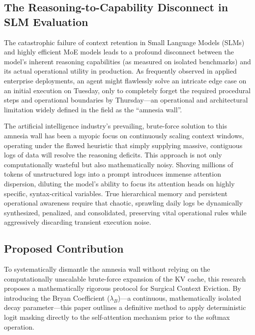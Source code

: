 \documentclass[11pt,a4paper]{article}
\newcommand{\bryanCoeff}{\lambda_B}
\begin{document}
\subsection{The Reasoning-to-Capability Disconnect in SLM Evaluation}
The catastrophic failure of context retention in Small Language Models (SLMs) and highly efficient MoE models leads to a profound disconnect between the model's inherent reasoning capabilities (as measured on isolated benchmarks) and its actual operational utility in production. As frequently observed in applied enterprise deployments, an agent might flawlessly solve an intricate edge case on an initial execution on Tuesday, only to completely forget the required procedural steps and operational boundaries by Thursday---an operational and architectural limitation widely defined in the field as the ``amnesia wall''.\cite{1}

The artificial intelligence industry's prevailing, brute-force solution to this amnesia wall has been a myopic focus on continuously scaling context windows, operating under the flawed heuristic that simply supplying massive, contiguous logs of data will resolve the reasoning deficits.\cite{1} This approach is not only computationally wasteful but also mathematically noisy. Shoving millions of tokens of unstructured logs into a prompt introduces immense attention dispersion, diluting the model's ability to focus its attention heads on highly specific, syntax-critical variables.\cite{1} True hierarchical memory and persistent operational awareness require that chaotic, sprawling daily logs be dynamically synthesized, penalized, and consolidated, preserving vital operational rules while aggressively discarding transient execution noise.\cite{1}

\subsection{Proposed Contribution}
To systematically dismantle the amnesia wall without relying on the computationally unscalable brute-force expansion of the KV cache, this research proposes a mathematically rigorous protocol for Surgical Context Eviction. By introducing the Bryan Coefficient (\(\bryanCoeff\))---a continuous, mathematically isolated decay parameter---this paper outlines a definitive method to apply deterministic logit masking directly to the self-attention mechanism prior to the softmax operation.
\end{document}
